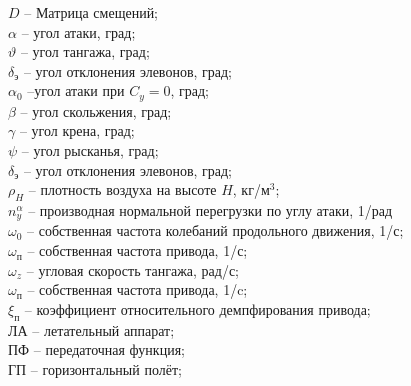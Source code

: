 $D$ -- Матрица смещений; \\  
$\alpha$ -- угол атаки, град; \\ 
$\vartheta$ -- угол тангажа, град; \\ 
$\delta_\text{э}$ -- угол отклонения элевонов, град; \\ 
$\alpha_0$ --угол атаки при $C_y = 0$, град;\\
$\beta$ -- угол скольжения, град; \\
$\gamma$ -- угол крена, град;\\
$\psi$ -- угол рысканья, град;\\ 
$\delta_\text{э}$ -- угол отклонения элевонов, град;\\
$\rho_H$ -- плотность воздуха на высоте $H$, кг/м$^3$;\\
$n_y^\alpha$ – производная нормальной перегрузки по углу атаки, 1/рад \\
$\omega_0$ -- собственная частота колебаний продольного движения, 1/с; \\ 
$\omega_\text{п}$ -- собственная частота привода, 1/с; \\ 
$\omega_z$ -- угловая скорость тангажа, рад/с; \\ 
$\omega_\text{п}$ -- собственная частота привода, 1/c; \\
$\xi_\text{п}$ -- коэффициент относительного демпфирования привода; \\
ЛА -- летательный аппарат; \\ 
ПФ -- передаточная функция; \\ 
ГП -- горизонтальный полёт; \\
